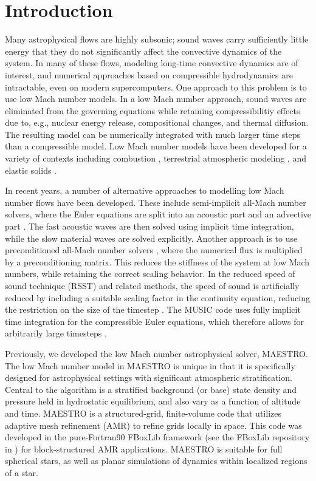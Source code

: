 \section{Introduction} \label{sec:intro}
Many astrophysical flows are highly subsonic; sound waves carry sufficiently little energy that they do not significantly affect the convective dynamics of the system.
In many of these flows, modeling long-time convective dynamics are of interest, and numerical approaches based on compressible hydrodynamics are intractable, even on modern supercomputers.
One approach to this problem is to use low Mach number models.
In a low Mach number approach, sound waves are eliminated from the governing equations while retaining compressibilitiy effects due to, e.g., nuclear energy release, compositional changes, and thermal diffusion.
The resulting model can be numerically integrated with much larger time steps than a compressible model.
Low Mach number models have been developed for a variety of contexts including combustion \citep{day2000numerical}, terrestrial atmospheric modeling \citep{duarte2015low},
and elastic solids \citep{abbate2017all}.

In recent years, a number of alternative approaches to modelling low Mach number flows have been developed. These include semi-implicit all-Mach number solvers, where the Euler equations
are split into an acoustic part and an advective part \citep{Kwatra2009,Degond2009,Cordier2012,Haack2012,Happenhofer2013,Chalons2016,Padioleau2019}. The fast acoustic waves are then
solved using implicit time integration, while the slow material waves are solved explicitly. Another approach is to use preconditioned all-Mach number solvers
\citep{Miczek2014,Barsukow2016}, where the numerical flux is multiplied by a preconditioning matrix. This reduces the stiffness of the system at low Mach numbers, while retaining the
correct scaling behavior. In the reduced speed of sound technique (RSST) and related methods, the speed of sound is artificially reduced by including a suitable scaling factor in the
continuity equation, reducing the restriction on the size of the timestep \citep{Rempel2005,Hotta2012,Wang2015,Takeyama2017,Iijima2018}. The MUSIC code uses fully implicit time integration for the compressible Euler equations, which therefore allows for arbitrarily large timesteps \citep{Viallet2011,Viallet2015,Goffrey2016}.

Previously, we developed the low Mach number astrophysical solver, MAESTRO.
The low Mach number model in MAESTRO is unique in that it is specifically designed for astrophysical settings with significant atmospheric stratification.
Central to the algorithm is a stratified background (or base) state density and pressure held in hydrostatic equilibrium, and also vary as a function of altitude and time.
MAESTRO is a structured-grid, finite-volume code that utilizes adaptive mesh refinement (AMR) to refine grids locally in space.
This code was developed in the pure-Fortran90 FBoxLib framework (see the FBoxLib repository in \cite{AMReX}) for block-structured AMR applications.
MAESTRO is suitable for full spherical stars, as well as planar simulations of dynamics within localized regions of a star.

